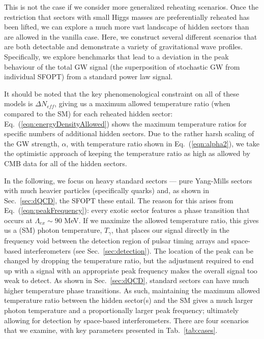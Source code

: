 \documentclass[nofootinbib,twocolumn,preprintnumbers]{revtex4-1}
\begin{document}
This is not the case if we consider more generalized reheating scenarios. Once the restriction that sectors with small Higgs masses are preferentially reheated has been lifted, we can explore a much more vast landscape of hidden sectors than are allowed in the vanilla case. Here, we construct several different scenarios that are both detectable and demonstrate a variety of gravitational wave profiles. Specifically, we explore benchmarks that lead to a deviation in the peak behaviour of the total GW signal (the superposition of stochastic GW from individual SFOPT) from a standard power law signal.

It should be noted that the key phenomenological constraint on all of these models is $\Delta N_{eff}$, giving us a maximum allowed temperature ratio (when compared to the SM) for each reheated hidden sector: Eq.~(\ref{eqn:energyDensityAllowed}) shows the maximum temperature ratios for specific numbers of additional hidden sectors. Due to the rather harsh scaling of the GW strength, $\alpha$, with temperature ratio shown in Eq.~(\ref{eqn:alpha2}), we take the optimistic approach of keeping the temperature ratio as high as allowed by CMB data for all of the hidden sectors.

In the following, we focus on heavy standard sectors --- pure Yang-Mills sectors with much heavier particles (specifically quarks) and, as shown in Sec.~\ref{sec:dQCD}, the SFOPT these entail. The reason for this arises from Eq.~(\ref{eqn:peakFrequency}): every exotic sector features a phase transition that occurs at $\Lambda_{ex} \sim 90$ MeV. If we maximize the allowed temperature ratio, this gives us a (SM) photon temperature, $T_{\gamma}$, that places our signal directly in the frequency void between the detection region of pulsar timing arrays and space-based interferometers (see Sec.~\ref{sec:detection}). The location of the peak can be changed by dropping the temperature ratio, but the adjustment required to end up with a signal with an appropriate peak frequency makes the overall signal too weak to detect. As shown in Sec.~\ref{sec:dQCD}, standard sectors can have much higher temperature phase transitions. As such, maintaining the maximum allowed temperature ratio between the hidden sector(s) and the SM gives a much larger photon temperature and a proportionally larger peak frequency; ultimately allowing for detection by space-based interferometers. There are four scenarios that we examine, with key parameters presented in Tab.~\ref{tab:cases}.
\end{document}
